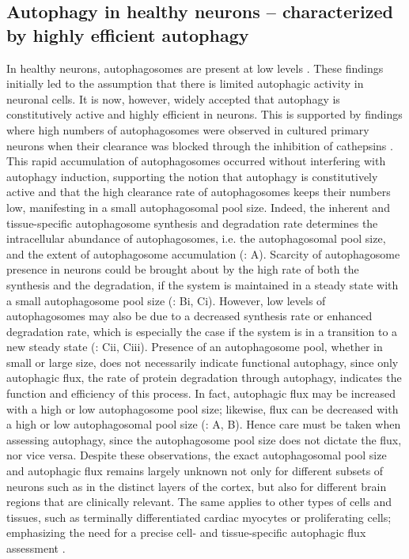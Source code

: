 \subsection{Autophagy in healthy neurons – characterized by highly efficient autophagy}
In healthy neurons, autophagosomes are present at low levels \citep{Boland2008,Mizushima2004a,Nixon2005}. These findings initially led to the assumption that there is limited autophagic activity in neuronal cells. It is now, however, widely accepted that autophagy is constitutively active and highly efficient in neurons. This is supported by findings where high numbers of autophagosomes were observed in cultured primary neurons when their clearance was blocked through the inhibition of cathepsins \citep{Boland2008}. This rapid accumulation of autophagosomes occurred without interfering with autophagy induction, supporting the notion that autophagy is constitutively active and that the high clearance rate of autophagosomes keeps their numbers low, manifesting in a small autophagosomal pool size. Indeed, the inherent and tissue-specific \citep{Mizushima2004a} autophagosome synthesis and degradation rate determines the intracellular abundance of autophagosomes, i.e. the autophagosomal pool size, and the extent of autophagosome accumulation (: A). Scarcity of autophagosome presence in neurons could be brought about by the high rate of both the synthesis and the degradation, if the system is maintained in a steady state with a small autophagosome pool size (: Bi, Ci). However, low levels of autophagosomes may also be due to a decreased synthesis rate or enhanced degradation rate, which is especially the case if the system is in a transition to a new steady state (: Cii, Ciii). Presence of an autophagosome pool, whether in small or large size, does not necessarily indicate functional autophagy, since only autophagic flux, the rate of protein degradation through autophagy, indicates the function and efficiency of this process. In fact, autophagic flux may be increased with a high or low autophagosome pool size; likewise, flux can be decreased with a high or low autophagosomal pool size \citep{loos2014} (: A, B). Hence care must be taken when assessing autophagy, since the autophagosome pool size does not dictate the flux, nor vice versa. Despite these observations, the exact autophagosomal pool size and autophagic flux remains largely unknown not only for different subsets of neurons such as in the distinct layers of the cortex, but also for different brain regions that are clinically relevant. The same applies to other types of cells and tissues, such as terminally differentiated cardiac myocytes or proliferating cells; emphasizing the need for a precise cell- and tissue-specific autophagic flux assessment \citep{Kaizuka2016}.


